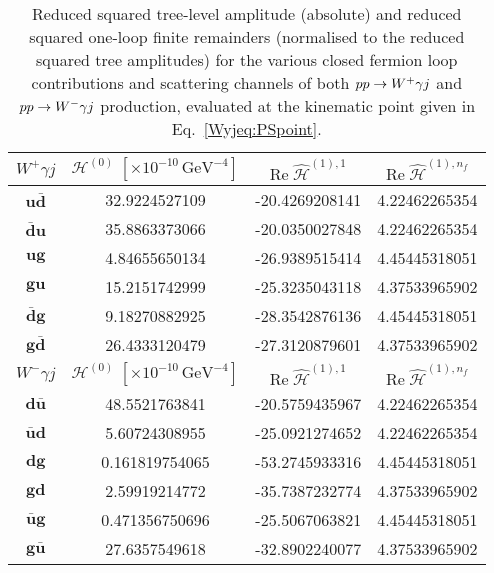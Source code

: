 \documentclass[main.tex]{subfiles}
\begin{document}
\begin{table}[t!]
\centering
\begin{tabularx}{1\textwidth}{|C{0.4}|C{1.2}|C{1.2}|C{1.2}|}
\hline
$W^+\gamma j$ & $\mathcal{H}^{(0)}  \; [\times 10^{-10}\,\mathrm{GeV}^{-4}] $ & $\mathrm{Re}\;\hat{\mathcal{H}}^{(1),1}$ & $\mathrm{Re}\;\hat{\mathcal{H}}^{(1),n_f}$  \\
\hline
$\mathbf{u\bar{d}}$ & 32.9224527109  & -20.4269208141 & 4.22462265354  \\
$\mathbf{\bar{d}u}$ & 35.8863373066  & -20.0350027848 & 4.22462265354  \\
$\mathbf{ug}      $ & 4.84655650134  & -26.9389515414 & 4.45445318051  \\
$\mathbf{gu}      $ & 15.2151742999  & -25.3235043118 & 4.37533965902  \\
$\mathbf{\bar{d}g}$ & 9.18270882925  & -28.3542876136 & 4.45445318051  \\
$\mathbf{g\bar{d}}$ & 26.4333120479  & -27.3120879601 & 4.37533965902  \\
\hline
\hline
$W^-\gamma j$ & $\mathcal{H}^{(0)}  \; [\times 10^{-10}\,\mathrm{GeV}^{-4}] $ & $\mathrm{Re}\;\hat{\mathcal{H}}^{(1),1}$ & $\mathrm{Re}\;\hat{\mathcal{H}}^{(1),n_f}$  \\
\hline
$\mathbf{d\bar{u}}$ & 48.5521763841  & -20.5759435967 & 4.22462265354  \\
$\mathbf{\bar{u}d}$ & 5.60724308955  & -25.0921274652 & 4.22462265354  \\
$\mathbf{dg}      $ & 0.161819754065 & -53.2745933316 & 4.45445318051  \\
$\mathbf{gd}      $ & 2.59919214772  & -35.7387232774 & 4.37533965902  \\
$\mathbf{\bar{u}g}$ & 0.471356750696 & -25.5067063821 & 4.45445318051  \\
$\mathbf{g\bar{u}}$ & 27.6357549618  & -32.8902240077 & 4.37533965902  \\
\hline
\end{tabularx}
\caption{\label{Wyjtab:benchmarkfinremsq1L} 
Reduced squared tree-level amplitude (absolute) and reduced squared one-loop finite remainders (normalised to the reduced squared tree amplitudes)
for the various closed fermion loop contributions and scattering channels of both $pp\to W^+\gamma j$ and $pp\to W^-\gamma j$ production,
evaluated at the kinematic point given in Eq.~\ref{Wyjeq:PSpoint}.
}
\end{table}

\renewcommand{\theequation}{F.\arabic{equation}}
\end{document}
